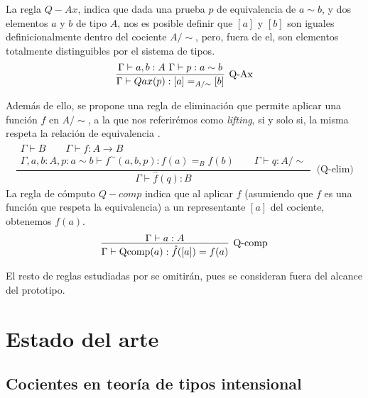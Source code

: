 La regla $Q-Ax$, indica que dada una prueba $p$ de equivalencia de $a \sim b$, y dos elementos $a$ y $b$ de tipo $A$, nos es posible definir que $[a]$ y $[b]$ son iguales definicionalmente dentro del cociente $A/\sim$, pero, fuera de el, son elementos totalmente distinguibles por el sistema de tipos.
\begin{gather}
  \infer[\text{Q-Ax}]
  {\Gamma \vdash Qax(p) : [a] =_{A/\sim} [b]}
  {\Gamma \vdash a, b: A \, \, \Gamma \vdash p : a \sim b}
\end{gather}

Además de ello, se propone una regla de eliminación que permite aplicar una función $f$ en $A/\sim$, a la que nos referirémos como \textit{lifting}, si y solo si, la misma respeta la relación de equivalencia \citep{hofmann1995}.
\begin{gather}
  \dfrac{
    \begin{gathered}
      \Gamma \vdash B \qquad \Gamma \vdash f : A \to B \\
      \Gamma, a, b : A, p: a \sim b \vdash f^{\sim}(a,b,p) : f(a) =_B f(b)
      \qquad \Gamma \vdash q : A/{\sim}
    \end{gathered}
  }
  {\Gamma \vdash \hat{f}(q) : B}
  \;\; \text{(Q-elim)}
\end{gather}
La regla de cómputo $Q-comp$ indica que al aplicar $f$ (asumiendo que $f$ es una función que respeta la equivalencia) a un representante $[a]$ del cociente, obtenemos $f(a)$.
\begin{gather}
  \infer[\text{Q-comp}]
  {\Gamma \vdash \text{Qcomp}(a) : \hat{f}([a]) = f(a)}
  {\Gamma \vdash a : A}
\end{gather}

El resto de reglas estudiadas por \cite{nuoli} se omitirán, pues se consideran fuera del alcance del prototipo.

\chapter{Estado del arte}\label{ch:arte}

\section{Cocientes en teoría de tipos intensional}

